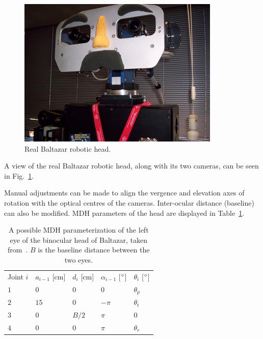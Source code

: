 \begin{figure}
\centering
\includegraphics{figures/balta_head_real}
\caption[Real Baltazar robotic head]{Real Baltazar robotic head.}
\label{img:balta_head_real}
\end{figure}

A view of the real Baltazar robotic head, along with its two cameras, can be seen in Fig.~\ref{img:balta_head_real}.

Manual adjustments can be made to align the vergence and elevation axes of rotation with the optical centres of the cameras. Inter-ocular distance (baseline) can also be modified. \ac{MDH} parameters of the head are displayed in Table~\ref{tab:balta_head_mdh}.

\begin{table}
\caption[\acs{MDH} parameters of Baltazar binocular head]{A possible \ac{MDH} parameterization of the left eye of the binocular head of Baltazar, taken from~\cite{lopes:2004}. $B$ is the baseline distance between the two eyes.}
\label{tab:balta_head_mdh}
\centering
\medskip
\begin{tabular}{*{5}{l}} %
\toprule
Joint $i$ & $a_{i-1}$ [cm] & $d_i$ [cm]& $\alpha_{i-1}$ [$^\circ$] & $\theta_i$ [$^\circ$] \\
\otoprule
$1$ & $0$ & $0$ & $0$ & $\theta_p$ \\
\midrule
$2$ & $15$ & $0$ & $-\pi$ & $\theta_t$ \\
\midrule
$3$ & $0$ & $B/2$ & $\pi$ & $0$ \\
\midrule
$4$ & $0$ & $0$ & $\pi$ & $\theta_r$ \\
\bottomrule
\end{tabular}
\end{table}

